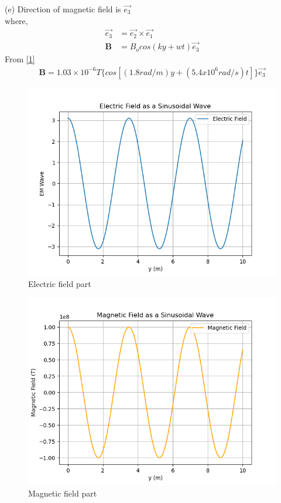 \documentclass[journal,12pt,twocolumn]{IEEEtran}
\theoremstyle{remark}
\begin{document}
(e)
Direction of magnetic field is $\vec{e_3}$\\
where,
\begin{align}
	\vec{e_3}&=\vec{e_2} \times \vec{e_1}\\
	\textbf{B}&=B_ocos(ky+wt)\vec{e_3}
\end{align}
 From \eqref{1}
\begin{align}
	\textbf{B}=1.03\times10^{-6}T\{cos[(1.8rad/m)y+(5.4x10^{6}rad/s)t]\}\vec{e_3}
\end{align}
\begin{figure}[h]
\centering
\includegraphics[width=1\columnwidth]{Ewave.png}
\caption{Electric field part}
\label{solution}
\end{figure}
\begin{figure}[h]
\centering
\includegraphics[width=1\columnwidth]{Mwave.png}
\caption{Magnetic field part}
\label{solution}
\end{figure}
\end{document}
